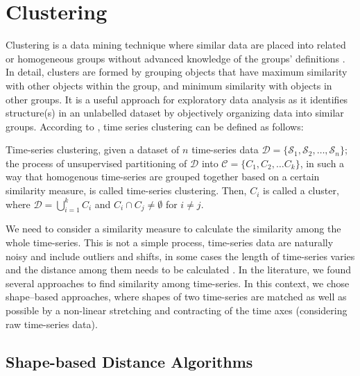 \section{Clustering}
\label{Sec:TimeSeriesClustering}

Clustering is a data mining technique where similar data are placed into related or homogeneous groups without advanced knowledge of the groups' definitions \cite{HastieTF2009}. In detail, clusters are formed by grouping objects that have maximum similarity with other objects within the group, and minimum similarity with objects in other groups. It is a useful approach for exploratory data analysis as it identifies structure(s) in an unlabelled dataset by objectively organizing data into similar groups. According to \cite{Aghabozorgi2015}, time series clustering can be defined as follows:

\begin{definition} Time-series clustering, given a dataset of $n$ time-series data $\mathcal{D} = \{ \mathcal{S}_1, \mathcal{S}_2, \ldots, \mathcal{S}_n\}$; the process of unsupervised partitioning of $\mathcal{D}$ into $\mathcal{C} = \{C_1, C_2, \ldots C_k\}$, in such a way
that homogenous time-series are grouped together based on a certain similarity measure, is called time-series clustering. Then, $C_i$ is called a cluster, where $\mathcal{D} = \bigcup_{i=1}^{k} C_{i}$ and $C_i \cap C_j \neq \emptyset$ for $i \neq j$.
\end{definition}

We need to consider a similarity measure to calculate the similarity among the whole time-series. This is not a simple process, time-series data are naturally noisy and include outliers and shifts, in some cases the length of time-series varies and the distance among them needs to be calculated \cite{Pal2017}. In the literature, we found several approaches to find similarity among time-series. In this context, we chose shape--based approaches, where shapes of two time-series are matched as well as possible by a non-linear stretching and contracting of the time axes (considering raw time-series data).

\subsection{Shape-based Distance Algorithms}
\label{sec:ShapeBasedDistance}

